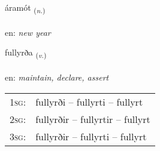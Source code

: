 \documentclass[frontgrid, backgrid]{flacards}\usepackage[]{graphicx}\usepackage[]{color}
\begin{document}
\renewcommand{\flhead}{\vskip5pt \fboxsep=0pt {\small\bfseries\footnotesize Nafnorð | Noun}}
\renewcommand{\fcfoot}{\vskip5pt \fboxsep=0pt \hspace{2pt}{\small\bfseries\footnotesize 2K}}

\renewcommand{\blhead}{\vskip5pt {\small\bfseries\footnotesize Nafnorð | Noun }}
\renewcommand{\bcfoot}{\vskip5pt \hspace{2pt}{\small\bfseries\footnotesize 2K}}


{áramót \small{\textsubscript{(\textit{n.})}} \\[1ex] %
\textphonetic{[auːramout]} \\
en: \emph{new year} \\  [2ex]
\renewcommand*{\arraystretch}{0.8}
}

\renewcommand{\flhead}{\vskip5pt \fboxsep=0pt {\small\bfseries\footnotesize Sagnorð | Verb}}
\renewcommand{\fcfoot}{\vskip5pt \fboxsep=0pt \hspace{2pt}{\small\bfseries\footnotesize 2K}}

\renewcommand{\blhead}{\vskip5pt {\small\bfseries\footnotesize Sagnorð | Verb }}
\renewcommand{\bcfoot}{\vskip5pt \hspace{2pt}{\small\bfseries\footnotesize 2K}}


{fullyrða \small{\textsubscript{(\textit{v.})}} \\[1ex] %
\textphonetic{[fʏtlɪrða]} \\
en: \emph{maintain, declare, assert} \\  [2ex]
\renewcommand*{\arraystretch}{0.8}
\begin{tabular}{p{1cm}l}
\textsc{1sg}: & fullyrði -- fullyrti -- fullyrt \\ 
\textsc{2sg}: & fullyrðir -- fullyrtir -- fullyrt \\ 
\textsc{3sg}: & fullyrðir -- fullyrti -- fullyrt \\ 
\end{tabular}
}
\end{document}
